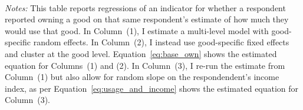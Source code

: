 \begin{table}[!htbp]
\begin{tabular}{@{\extracolsep{5pt}}lD{.}{.}{-3} D{.}{.}{-3} D{.}{.}{-3} }
\end{tabular}
\\{\footnotesize \begin{minipage}{0.90 \linewidth} \emph{Notes:}
This table reports regressions of an indicator for whether a respondent reported owning a good on that same respondent's estimate of how much they would use that good.
In Column~(1), I estimate a multi-level model with good-specific random effects.
In Column~(2), I instead use good-specific fixed effects and cluster at the good level.
Equation~\ref{eq:base_own} shows the estimated equation for Columns~(1) and (2). 
In Column~(3), I re-run the estimate from Column~(1) but also allow for random slope on the respondendent's income index, as per Equation~\ref{eq:usage_and_income} shows the estimated equation for Column~(3). 
\starlanguage \end{minipage} }
\end{table}
